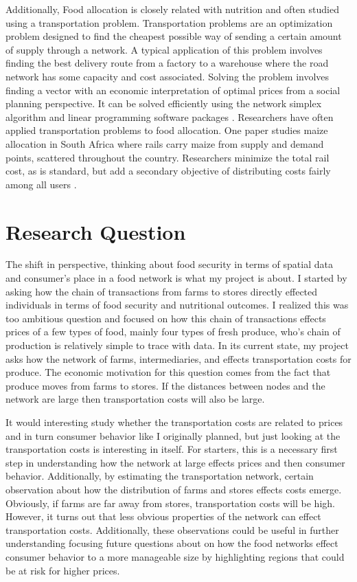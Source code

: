 \documentclass{report}
\begin{document}
Additionally, Food allocation is closely related with nutrition and often studied using a transportation problem. Transportation problems are an optimization problem designed to find the cheapest possible way of sending a certain amount of supply through a network. A typical application of this problem involves finding the best delivery route from a factory to a warehouse where the road network has some capacity and cost associated. Solving the problem involves finding a vector with an economic interpretation of optimal prices from a social planning perspective. It can be solved efficiently using the network simplex algorithm and linear programming software packages \cite{Cook}. Researchers have often applied transportation problems to food allocation. One paper studies maize allocation in South Africa where rails carry maize from supply and demand points, scattered throughout the country. Researchers minimize the total rail cost, as is standard, but add a secondary objective of distributing costs fairly among all users \cite{Stewart}.

\section{Research Question} 

The shift in perspective, thinking about food security in terms of spatial data and consumer's place in a food network is what my project is about. I started by asking how the chain of transactions from farms to stores directly effected individuals in terms of food security and nutritional outcomes. I realized this was too ambitious question and focused on how this chain of transactions effects prices of a few types of food, mainly four types of fresh produce, who's chain of production is relatively simple to trace with data. In its current state, my project asks how the network of farms, intermediaries, and effects transportation costs for produce. The economic motivation for this question comes from the fact that produce moves from farms to stores. If the distances between nodes and the network are large then transportation costs will also be large.

It would interesting study whether the transportation costs are related to prices and in turn consumer behavior like I originally planned, but just looking at the transportation costs is interesting in itself. For starters, this is a necessary first step in understanding how the network at large effects prices and then consumer behavior. Additionally, by estimating the transportation network, certain observation about how the distribution of farms and stores effects costs emerge. Obviously, if farms are far away from stores, transportation costs will be high. However, it turns out that less obvious properties of the network can effect transportation costs. Additionally, these observations could be useful in further understanding focusing future questions about on how the food networks effect consumer behavior to a more manageable size by highlighting regions that could be at risk for higher prices.
\end{document}
